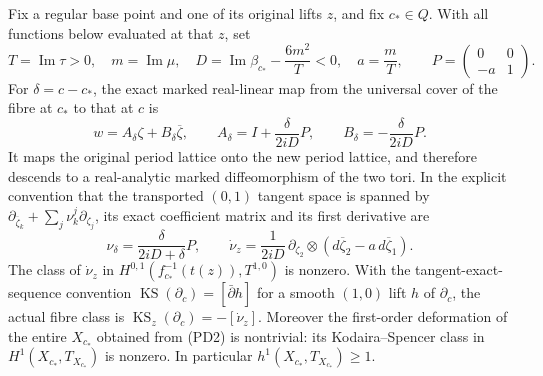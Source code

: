 \begin{theorem}
Fix a regular base point and one of its original lifts $z$, and fix
$c_*\in Q$. With all functions below evaluated at that $z$, set
\[
 T=\operatorname{Im}\tau>0,\quad m=\operatorname{Im}\mu,\quad
 D=\operatorname{Im}\beta_{c_*}-\frac{6m^2}{T}<0,\quad a=\frac mT,
 \qquad P=\begin{pmatrix}0&0\\-a&1\end{pmatrix}.
 \tag{PD3}
\]
For $\delta=c-c_*$, the exact marked real-linear map from the universal
cover of the fibre at $c_*$ to that at $c$ is
\[
 w=A_\delta\zeta+B_\delta\overline\zeta,\qquad
 A_\delta=I+\frac{\delta}{2iD}P,\qquad
 B_\delta=-\frac{\delta}{2iD}P.
 \tag{PD4}
\]
It maps the original period lattice onto the new period lattice, and
therefore descends to a real-analytic marked diffeomorphism of the two
tori. In the explicit convention that the transported $(0,1)$ tangent
space is spanned by
$\partial_{\overline\zeta_k}+\sum_j\nu^j_k\partial_{\zeta_j}$,
its exact coefficient matrix and its first derivative are
\[
 \nu_\delta=\frac{\delta}{2iD+\delta}P,\qquad
 \dot\nu_z=\frac{1}{2iD}\,
 \partial_{\zeta_2}\otimes
 (d\overline\zeta_2-a\,d\overline\zeta_1).
 \tag{PD5}
\]
The class of $\dot\nu_z$ in
$H^{0,1}(f_{c_*}^{-1}(t(z)),T^{1,0})$ is nonzero.
With the tangent-exact-sequence convention
$\operatorname{KS}(\partial_c)=[\bar\partial h]$ for a smooth
$(1,0)$ lift $h$ of $\partial_c$, the actual fibre class is
$\operatorname{KS}_z(\partial_c)=-[\dot\nu_z]$.
Moreover the first-order deformation of the entire $X_{c_*}$ obtained
from (PD2) is nontrivial: its Kodaira--Spencer class in
$H^1(X_{c_*},T_{X_{c_*}})$ is nonzero. In particular
$h^1(X_{c_*},T_{X_{c_*}})\geq1$.
\end{theorem}



